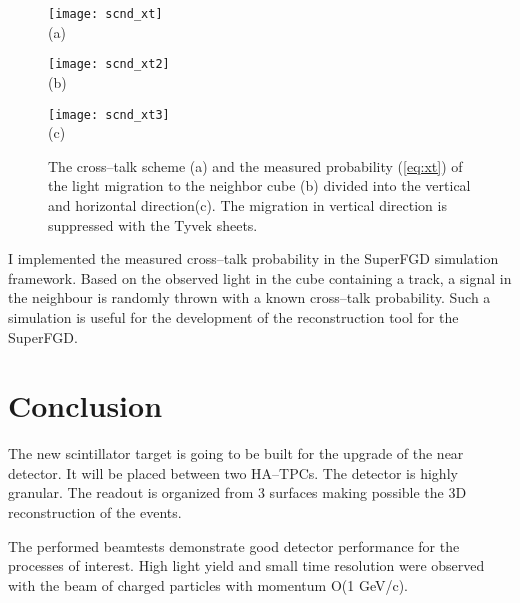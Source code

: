 \documentclass[main.tex]{subfiles}
\begin{document}
\begin{figure}[!ht]
	\centering
	\begin{minipage}{0.33\linewidth}
		\centering
		\texttt{[image: scnd\_xt]} \\ (a)
	\end{minipage}
	\begin{minipage}{0.33\linewidth}
		\centering
		\texttt{[image: scnd\_xt2]} \\ (b)
	\end{minipage}
	\begin{minipage}{0.33\linewidth}
		\centering
		\texttt{[image: scnd\_xt3]} \\ (c)
	\end{minipage}
	\caption{The cross--talk scheme (a) and the measured probability (\autoref{eq:xt}) of the light migration to the neighbor cube (b) divided into the vertical and horizontal direction(c). The migration in vertical direction is suppressed with the Tyvek sheets.}
	\label{fig:sfgd:up:xt}
\end{figure}
I implemented the measured cross--talk probability in the SuperFGD simulation framework. Based on the observed light in the cube containing a track, a signal in the neighbour is randomly thrown with a known cross--talk probability. Such a simulation is useful for the development of the reconstruction tool for the SuperFGD.

\section{Conclusion}
The new scintillator target is going to be built for the upgrade of the near detector. It will be placed between two HA--TPCs. The detector is highly granular. The readout is organized from 3 surfaces making possible the 3D reconstruction of the events.

The performed beamtests demonstrate good detector performance for the processes of interest. High light yield and small time resolution were observed with the beam of charged particles with momentum O(1 GeV/c).
\end{document}
